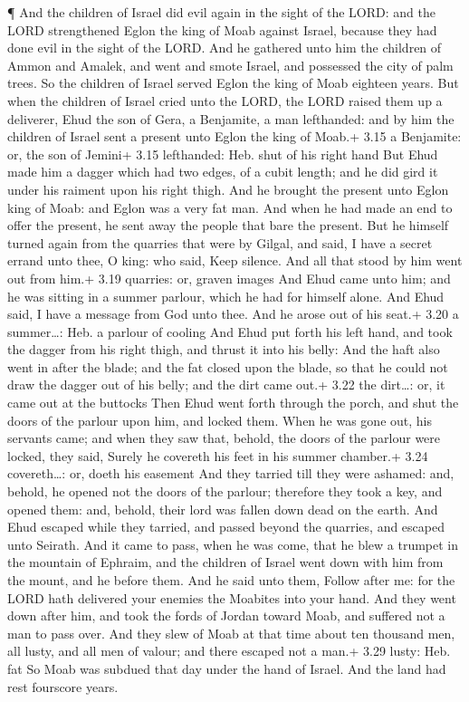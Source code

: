  ¶ And the children of Israel did evil again in the sight
of the LORD: and the LORD strengthened Eglon the king of Moab against
Israel, because they had done evil in the sight of the LORD.
 And he gathered unto him the children of Ammon and Amalek,
and went and smote Israel, and possessed the city of palm trees.
 So the children of Israel served Eglon the king of Moab
eighteen years.  But when the children of Israel cried unto
the LORD, the LORD raised them up a deliverer, Ehud the son of Gera, a
Benjamite, a man lefthanded: and by him the children of Israel sent a
present unto Eglon the king of Moab.+ 3.15 a Benjamite: or, the son of
Jemini+ 3.15 lefthanded: Heb. shut of his right hand  But
Ehud made him a dagger which had two edges, of a cubit length; and he
did gird it under his raiment upon his right thigh.  And he
brought the present unto Eglon king of Moab: and Eglon was a very fat
man.  And when he had made an end to offer the present, he
sent away the people that bare the present.  But he himself
turned again from the quarries that were by Gilgal, and said, I have a
secret errand unto thee, O king: who said, Keep silence. And all that
stood by him went out from him.+ 3.19 quarries: or, graven images
 And Ehud came unto him; and he was sitting in a summer
parlour, which he had for himself alone. And Ehud said, I have a message
from God unto thee. And he arose out of his seat.+ 3.20 a summer\ldots:
Heb. a parlour of cooling  And Ehud put forth his left
hand, and took the dagger from his right thigh, and thrust it into his
belly:  And the haft also went in after the blade; and the
fat closed upon the blade, so that he could not draw the dagger out of
his belly; and the dirt came out.+ 3.22 the dirt\ldots: or, it came out
at the buttocks  Then Ehud went forth through the porch,
and shut the doors of the parlour upon him, and locked them.
 When he was gone out, his servants came; and when they saw
that, behold, the doors of the parlour were locked, they said, Surely he
covereth his feet in his summer chamber.+ 3.24 covereth\ldots: or, doeth
his easement  And they tarried till they were ashamed: and,
behold, he opened not the doors of the parlour; therefore they took a
key, and opened them: and, behold, their lord was fallen down dead on
the earth.  And Ehud escaped while they tarried, and passed
beyond the quarries, and escaped unto Seirath.  And it came
to pass, when he was come, that he blew a trumpet in the mountain of
Ephraim, and the children of Israel went down with him from the mount,
and he before them.  And he said unto them, Follow after
me: for the LORD hath delivered your enemies the Moabites into your
hand. And they went down after him, and took the fords of Jordan toward
Moab, and suffered not a man to pass over.  And they slew
of Moab at that time about ten thousand men, all lusty, and all men of
valour; and there escaped not a man.+ 3.29 lusty: Heb. fat 
So Moab was subdued that day under the hand of Israel. And the land had
rest fourscore years.

